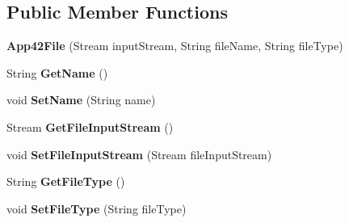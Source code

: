 \subsection*{Public Member Functions}
\begin{DoxyCompactItemize}
\item 
\hypertarget{classcom_1_1shephertz_1_1app42_1_1paas_1_1sdk_1_1windows_1_1_app42_file_acac6d1f93b3b304029675cd4856ba23f}{{\bfseries App42\+File} (Stream input\+Stream, String file\+Name, String file\+Type)}\label{classcom_1_1shephertz_1_1app42_1_1paas_1_1sdk_1_1windows_1_1_app42_file_acac6d1f93b3b304029675cd4856ba23f}

\item 
\hypertarget{classcom_1_1shephertz_1_1app42_1_1paas_1_1sdk_1_1windows_1_1_app42_file_a8586139c1c9e4d108a2dbfba47d2b79b}{String {\bfseries Get\+Name} ()}\label{classcom_1_1shephertz_1_1app42_1_1paas_1_1sdk_1_1windows_1_1_app42_file_a8586139c1c9e4d108a2dbfba47d2b79b}

\item 
\hypertarget{classcom_1_1shephertz_1_1app42_1_1paas_1_1sdk_1_1windows_1_1_app42_file_a4f336ca8c1cfe191db7fb71b55068902}{void {\bfseries Set\+Name} (String name)}\label{classcom_1_1shephertz_1_1app42_1_1paas_1_1sdk_1_1windows_1_1_app42_file_a4f336ca8c1cfe191db7fb71b55068902}

\item 
\hypertarget{classcom_1_1shephertz_1_1app42_1_1paas_1_1sdk_1_1windows_1_1_app42_file_a28fb5148972ab5ac8d608b4b659edc49}{Stream {\bfseries Get\+File\+Input\+Stream} ()}\label{classcom_1_1shephertz_1_1app42_1_1paas_1_1sdk_1_1windows_1_1_app42_file_a28fb5148972ab5ac8d608b4b659edc49}

\item 
\hypertarget{classcom_1_1shephertz_1_1app42_1_1paas_1_1sdk_1_1windows_1_1_app42_file_a0073bd2e35781858e55ef875ec4300b9}{void {\bfseries Set\+File\+Input\+Stream} (Stream file\+Input\+Stream)}\label{classcom_1_1shephertz_1_1app42_1_1paas_1_1sdk_1_1windows_1_1_app42_file_a0073bd2e35781858e55ef875ec4300b9}

\item 
\hypertarget{classcom_1_1shephertz_1_1app42_1_1paas_1_1sdk_1_1windows_1_1_app42_file_a2a0b7656bd1c43597206c60ceb484657}{String {\bfseries Get\+File\+Type} ()}\label{classcom_1_1shephertz_1_1app42_1_1paas_1_1sdk_1_1windows_1_1_app42_file_a2a0b7656bd1c43597206c60ceb484657}

\item 
\hypertarget{classcom_1_1shephertz_1_1app42_1_1paas_1_1sdk_1_1windows_1_1_app42_file_ac44967121cbf5e128fcc99d863dc0c91}{void {\bfseries Set\+File\+Type} (String file\+Type)}\label{classcom_1_1shephertz_1_1app42_1_1paas_1_1sdk_1_1windows_1_1_app42_file_ac44967121cbf5e128fcc99d863dc0c91}


\end{DoxyCompactItemize}
